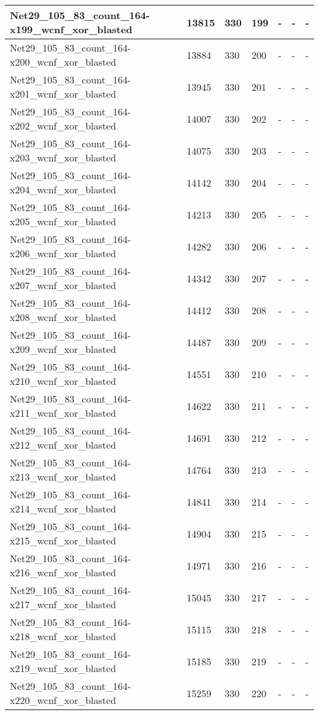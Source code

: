 \begin{scriptsize}
\begin{longtable}{|p{5cm}|l|l|l|l|l|l|}
Net29\_105\_83\_count\_164-x199\_wcnf\_xor\_blasted&13815&330&199&-&-&- \\ \hline 
Net29\_105\_83\_count\_164-x200\_wcnf\_xor\_blasted&13884&330&200&-&-&- \\ \hline 
Net29\_105\_83\_count\_164-x201\_wcnf\_xor\_blasted&13945&330&201&-&-&- \\ \hline 
Net29\_105\_83\_count\_164-x202\_wcnf\_xor\_blasted&14007&330&202&-&-&- \\ \hline 
Net29\_105\_83\_count\_164-x203\_wcnf\_xor\_blasted&14075&330&203&-&-&- \\ \hline 
Net29\_105\_83\_count\_164-x204\_wcnf\_xor\_blasted&14142&330&204&-&-&- \\ \hline 
Net29\_105\_83\_count\_164-x205\_wcnf\_xor\_blasted&14213&330&205&-&-&- \\ \hline 
Net29\_105\_83\_count\_164-x206\_wcnf\_xor\_blasted&14282&330&206&-&-&- \\ \hline 
Net29\_105\_83\_count\_164-x207\_wcnf\_xor\_blasted&14342&330&207&-&-&- \\ \hline 
Net29\_105\_83\_count\_164-x208\_wcnf\_xor\_blasted&14412&330&208&-&-&- \\ \hline 
Net29\_105\_83\_count\_164-x209\_wcnf\_xor\_blasted&14487&330&209&-&-&- \\ \hline 
Net29\_105\_83\_count\_164-x210\_wcnf\_xor\_blasted&14551&330&210&-&-&- \\ \hline 
Net29\_105\_83\_count\_164-x211\_wcnf\_xor\_blasted&14622&330&211&-&-&- \\ \hline 
Net29\_105\_83\_count\_164-x212\_wcnf\_xor\_blasted&14691&330&212&-&-&- \\ \hline 
Net29\_105\_83\_count\_164-x213\_wcnf\_xor\_blasted&14764&330&213&-&-&- \\ \hline 
Net29\_105\_83\_count\_164-x214\_wcnf\_xor\_blasted&14841&330&214&-&-&- \\ \hline 
Net29\_105\_83\_count\_164-x215\_wcnf\_xor\_blasted&14904&330&215&-&-&- \\ \hline 
Net29\_105\_83\_count\_164-x216\_wcnf\_xor\_blasted&14971&330&216&-&-&- \\ \hline 
Net29\_105\_83\_count\_164-x217\_wcnf\_xor\_blasted&15045&330&217&-&-&- \\ \hline 
Net29\_105\_83\_count\_164-x218\_wcnf\_xor\_blasted&15115&330&218&-&-&- \\ \hline 
Net29\_105\_83\_count\_164-x219\_wcnf\_xor\_blasted&15185&330&219&-&-&- \\ \hline 
Net29\_105\_83\_count\_164-x220\_wcnf\_xor\_blasted&15259&330&220&-&-&- \\ \hline 

\end{longtable}
\end{scriptsize}
